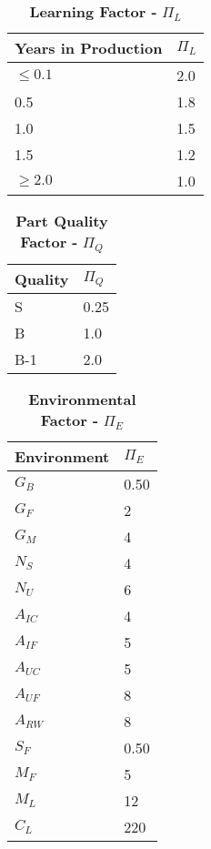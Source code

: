 \begin{table}
\caption{\textbf{Learning Factor -} $\Pi_{L}$}
\label{table:learningFactorIc}
\begin{tabular}{|l|m{10cm}|} \hline
\textbf{Years in Production} & $\Pi_{L}$ \\ \hline
$\leq 0.1$ & 2.0 \\ \hline
0.5 & 1.8 \\ \hline
1.0 & 1.5 \\ \hline
1.5 & 1.2 \\ \hline
$\geq 2.0$ & 1.0 \\ \hline
\end{tabular}
\end{table}


\begin{table}
\caption{\textbf{Part Quality  Factor -} $\Pi_{Q}$}
\label{table:partQualityFactorIc}
\begin{tabular}{|l|m{10cm}|} \hline
\textbf{Quality} & $\Pi_{Q}$ \\ \hline
S & 0.25 \\ \hline
B & 1.0 \\ \hline
B-1 & 2.0 \\ \hline
\end{tabular}
\end{table}


\begin{table}
\caption{\textbf{Environmental Factor -} $\Pi_{E}$}
\label{table:envFactorIc}
\begin{tabular}{|l|m{10cm}|} \hline
\textbf{Environment} & $\Pi_{E}$ \\ \hline
$G_{B}$ & 0.50 \\ \hline
$G_{F}$ & 2 \\ \hline
$G_{M}$ & 4 \\ \hline
$N_{S}$ & 4 \\ \hline
$N_{U}$ & 6 \\ \hline
$A_{IC}$ & 4 \\ \hline
$A_{IF}$ & 5 \\ \hline
$A_{UC}$ & 5 \\ \hline
$A_{UF}$ & 8 \\ \hline
$A_{RW}$ & 8 \\ \hline
$S_{F}$ & 0.50 \\ \hline
$M_{F}$ & 5 \\ \hline
$M_{L}$ & 12 \\ \hline
$C_{L}$ & 220 \\ \hline
\end{tabular}
\end{table}

